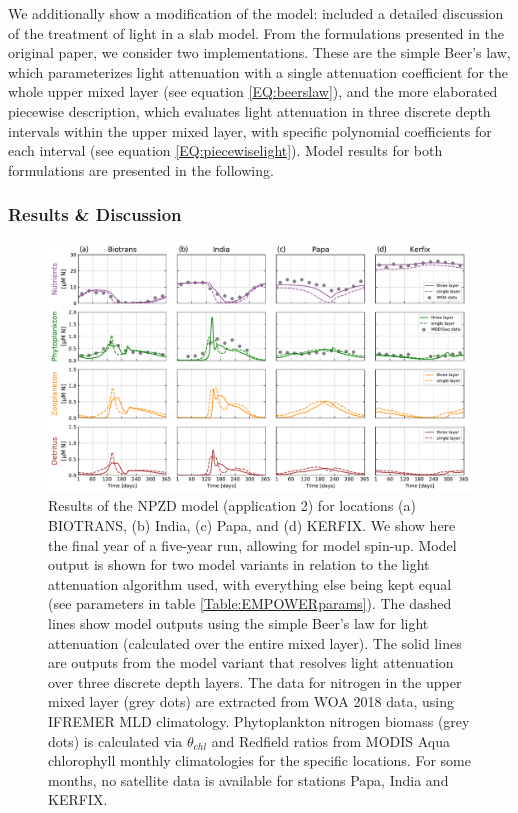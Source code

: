 \documentclass[journal abbreviation, manuscript]{copernicus}
\begin{document}
We additionally show a modification of the model: \citet{Anderson2015c} included a detailed discussion of the treatment of light in a slab model. From the formulations presented in the original paper, we consider two implementations. These are the simple Beer's law, which parameterizes light attenuation with a single attenuation coefficient for the whole upper mixed layer (see equation \ref{EQ:beerslaw}), and the more elaborated piecewise description, which evaluates light attenuation in three discrete depth intervals within the upper mixed layer, with specific polynomial coefficients for each interval (see equation \ref{EQ:piecewiselight}). Model results for both formulations are presented in the following.

\subsubsection{Results \& Discussion}
\begin{figure}[t]
\includegraphics[width=15cm]{Figures/firstdraft_plots/02_EMPOWER_lightcomp.pdf}
\caption{Results of the NPZD model (application 2) for locations (a) BIOTRANS, (b) India, (c) Papa, and (d) KERFIX. We show here the final year of a five-year run, allowing for model spin-up. Model output is shown for two model variants in relation to the light attenuation algorithm used, with everything else being kept equal (see parameters in table \ref{Table:EMPOWERparams}). The dashed lines show model outputs using the simple Beer's law for light attenuation (calculated over the entire mixed layer). The solid lines are outputs from the model variant that resolves light attenuation over three discrete depth layers. The data for nitrogen in the upper mixed layer (grey dots) are extracted from WOA 2018 data, using IFREMER MLD climatology. Phytoplankton nitrogen biomass (grey dots) is calculated via $\theta_{chl}$ and Redfield ratios from MODIS Aqua chlorophyll monthly climatologies for the specific locations. For some months,  no satellite data is available for stations Papa, India and KERFIX.}
\label{Figure:ResultsEMPOWER}
\end{figure}
\end{document}
